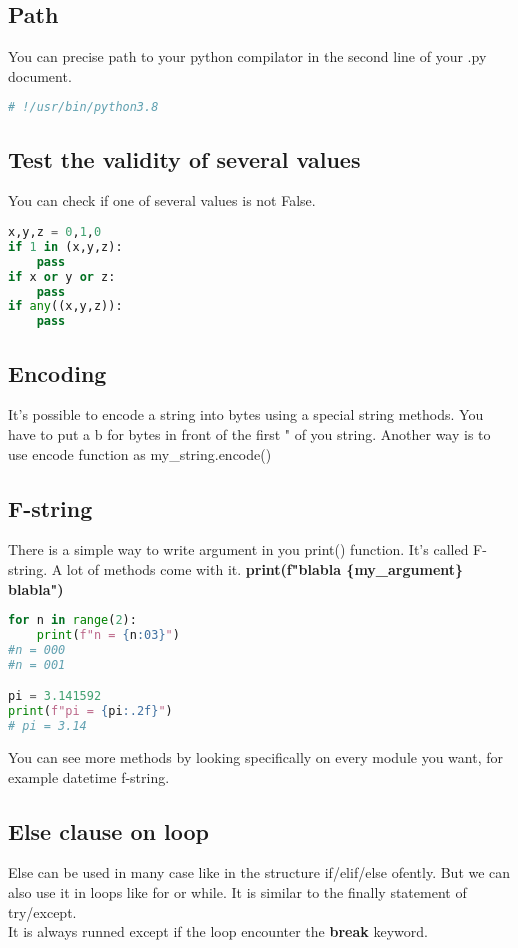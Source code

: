 \documentclass[a4paper, 12pt, titlepage]{scrartcl} %
\begin{document}
\subsection{Path}
You can precise path to your python compilator in the second line of your .py document.
\begin{lstlisting}[language=Python]
# !/usr/bin/python3.8
\end{lstlisting} \vspace{5mm}

\subsection{Test the validity of several values}
You can check if one of several values is not False.
\begin{lstlisting}[language=Python]
x,y,z = 0,1,0
if 1 in (x,y,z):
    pass
if x or y or z:
    pass
if any((x,y,z)):
    pass
\end{lstlisting} \vspace{5mm}

\subsection{Encoding}
It's possible to encode a string into bytes using a special string methods. You have to put a b for bytes in front of the first " of you string. Another way is to use encode function as my\_string.encode()

\subsection{F-string}
\label{subsec:F-string}
There is a simple way to write argument in you print() function. It's called F-string. A lot of methods come with it. \textbf{print(f"blabla \{my\_argument\} blabla")}
\begin{lstlisting}[language=Python]
for n in range(2):
	print(f"n = {n:03}")
#n = 000
#n = 001

pi = 3.141592
print(f"pi = {pi:.2f}") 
# pi = 3.14
\end{lstlisting} \vspace{5mm}

You can see more methods by looking specifically on every module you want, for example datetime f-string.

\subsection{Else clause on loop}
Else can be used in many case like in the structure if/elif/else ofently. But we can also use it in loops like for or while. It is similar to the finally statement of try/except. \\
It is always runned except if the loop encounter the \textbf{break} keyword.
\end{document}
